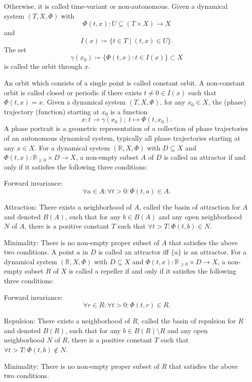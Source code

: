 \documentclass[a4paper,12pt]{report}
\begin{document}
Otherwise, it is called time-variant or non-autonomous.
Given a dynamical system $(T, X, \Phi)$ with
\[\Phi(t,x)\colon U\subseteq(T\times X)\to X\]
and
\[I(x)\coloneq\{t\in T\mid(t,x)\in U\}.\]
The set
\[\gamma(x_0)\coloneq\{\Phi (t,x)\colon t\in I(x)\}\subset X\]
is called the orbit through $x$.

An orbit which consists of a single point is called constant orbit. A non-constant orbit is called closed or periodic if there exists $t\neq 0\in I(x)$ such that $\Phi (t,x)=x$.
Given a dynamical system $(T, X, \Phi)$, for any $x_0\in X$, the (phase) trajectory (function) starting at $x_0$ is a function
\[x\colon t\to\gamma(x_0);\;t\mapsto\Phi(t,x_0).\]
A phase portrait is a geometric representation of a collection of phase trajectories of an autonomous dynamical system, typically all phase trajectories starting at any $x\in X$.
For a dynamical system $(\mathbb{R}, X, \Phi)$ with $D\subseteq X$ and $\Phi(t,x)\colon \mathbb{R}_{\geq 0}\times D\to X$, a non-empty subset $A$ of $D$ is called an attractor if and only if it satisfies the following three conditions:
\bit
\item Forward invariance:
    \[\forall a\in A\colon\forall t>0\colon\Phi(t,a)\in A.\]
\item Attraction: There exists a neighborhood of $A$, called the basin of attraction for $A$ and denoted $B(A)$, such that for any $b\in B(A)$ and any open neighborhood $N$ of $A$, there is a positive constant $T$ such that $\forall t>T\colon\Phi(t,b)\in N$.
\item Minimality: There is no non-empty proper subset of $A$ that satisfies the above two conditions.
\eit
A point $a$ in $D$ is called an attractor iff $\{a\}$ is an attractor.
For a dynamical system $(\mathbb{R}, X, \Phi)$ with $D\subseteq X$ and $\Phi(t,x)\colon \mathbb{R}_{\geq 0}\times D\to X$, a non-empty subset $R$ of $X$ is called a repeller if and only if it satisfies the following three conditions:
\bit
\item Forward invariance:
    \[\forall r\in R\colon\forall t>0\colon\Phi(t,r)\in R.\]
\item Repulsion: There exists a neighborhood of $R$, called the basin of repulsion for $R$ and denoted $B(R)$, such that for any $b\in B(R)\setminus R$ and any open neighborhood $N$ of $R$, there is a positive constant $T$ such that $\forall t>T\colon\Phi(t,b)\notin N$.
\item Minimality: There is no non-empty proper subset of $R$ that satisfies the above two conditions.
\end{document}
